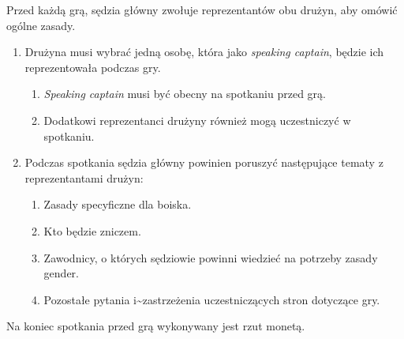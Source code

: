 \documentclass[11pt,a4paper]{article}
\renewcommand{\subsubsection}[1]{
  \oldsubsubsection{#1}%
  \label{\thesubsubsection}
}
\begin{document}
Przed każdą grą, sędzia główny zwołuje reprezentantów obu drużyn, aby
omówić ogólne zasady.

\begin{enumerate}

\item
  Drużyna musi wybrać jedną osobę, która jako \emph{speaking captain},
  będzie ich reprezentowała podczas gry.

  \begin{enumerate}
  
  \item
    \emph{Speaking captain} musi być obecny na spotkaniu przed grą.
  \item
    Dodatkowi reprezentanci drużyny również mogą uczestniczyć w
    spotkaniu.
  \end{enumerate}
\item
  Podczas spotkania sędzia główny powinien poruszyć następujące tematy z
  reprezentantami drużyn:

  \begin{enumerate}
  
  \item
    Zasady specyficzne dla boiska.
  \item
    Kto będzie zniczem.
  \item
    Zawodnicy, o których sędziowie powinni wiedzieć na potrzeby zasady
    gender.
  \item
    Pozostałe pytania i\textasciitilde{}zastrzeżenia uczestniczących
    stron dotyczące gry.
  \end{enumerate}
\end{enumerate}

\subsubsection{Rzut monetą}

Na koniec spotkania przed grą wykonywany jest rzut monetą.
\end{document}
